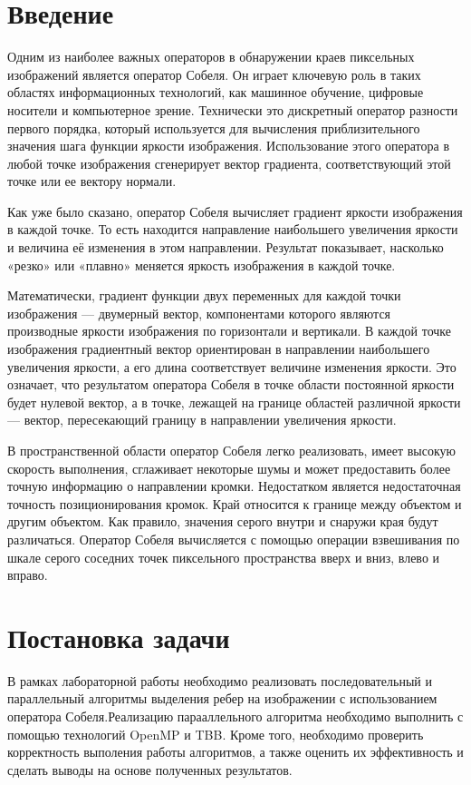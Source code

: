 \documentclass{report}
\begin{document}
\section*{Введение}
Одним из наиболее важных операторов в обнаружении краев пиксельных изображений является оператор Собеля. Он играет ключевую роль в таких областях информационных технологий, как машинное обучение, цифровые носители и компьютерное зрение. Технически это дискретный оператор разности первого порядка, который используется для вычисления приблизительного значения шага функции яркости изображения. Использование этого оператора в любой точке изображения сгенерирует вектор градиента, соответствующий этой точке или ее вектору нормали.
\par Как уже было сказано, оператор Собеля вычисляет градиент яркости изображения в каждой точке. То есть находится направление наибольшего увеличения яркости и величина её изменения в этом направлении. Результат показывает, насколько «резко» или «плавно» меняется яркость изображения в каждой точке.

Математически, градиент функции двух переменных для каждой точки изображения  — двумерный вектор, компонентами которого являются производные яркости изображения по горизонтали и вертикали. В каждой точке изображения градиентный вектор ориентирован в направлении наибольшего увеличения яркости, а его длина соответствует величине изменения яркости. Это означает, что результатом оператора Собеля в точке области постоянной яркости будет нулевой вектор, а в точке, лежащей на границе областей различной яркости — вектор, пересекающий границу в направлении увеличения яркости.

\par В пространственной области оператор Собеля легко реализовать, имеет высокую скорость выполнения, сглаживает некоторые шумы и может предоставить более точную информацию о направлении кромки. Недостатком является недостаточная точность позиционирования кромок. Край относится к границе между объектом и другим объектом. Как правило, значения серого внутри и снаружи края будут различаться. Оператор Собеля вычисляется с помощью операции взвешивания по шкале серого соседних точек пиксельного пространства вверх и вниз, влево и вправо.

\newpage

\section*{Постановка задачи}
В рамках лабораторной работы необходимо реализовать последовательный и параллельный алгоритмы выделения ребер на изображении с использованием оператора Собеля.Реализацию парааллельного алгоритма необходимо выполнить с помощью технологий OpenMP и TBB. Кроме того, необходимо  проверить корректность выполения работы алгоритмов, а также оценить их эффективность и сделать выводы на основе полученных результатов.
\newpage
\end{document}
